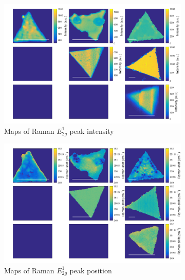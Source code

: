 \documentclass[12pt]{article}
\begin{document}
\begin{figure}[h]
	\begin{center}
		\begin{subfigure}[b]{0.4\textwidth}
			\includegraphics[width=\textwidth]{PaperSIMapsIntensityE.png}
			\caption{Maps of Raman $E^1_{2g}$ peak intensity}
			\label{fig:PaperSIMapsIntensityE}
		\end{subfigure}
		\quad
		\begin{subfigure}[b]{0.4\textwidth}
			\includegraphics[width=\textwidth]{PaperSIMapsPositionE.png}
			\caption{Maps of Raman $E^1_{2g}$ peak position}
			\label{fig:PaperSIMapsPositionE}
		\end{subfigure}
		\hfill
		\begin{subfigure}[b]{0.4\textwidth}

\end{subfigure}
\end{center}
\end{figure}
\end{document}
